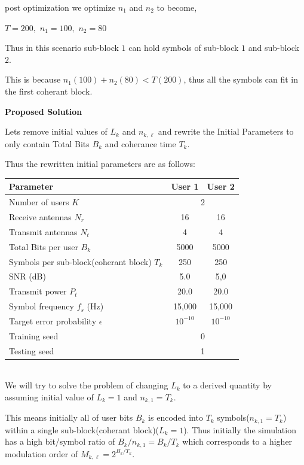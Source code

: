 \documentclass[a4paper, 12pt, onecolumn, journal, twoside, draftclsnofoot]{IEEEtran}
\begin{document}
post optimization we optimize $n_1$ and $n_2$ to become,

$T=200,$
$n_1 = 100,$
$n_2 = 80$

Thus in this scenario sub-block $1$ can hold symbols of sub-block $1$ and sub-block $2$.

This is because $n_1(100) + n_2(80) < T(200)$, thus all the symbols can fit in the first coherant block.

\newpage

\textbf{Proposed Solution}

Lets remove initial values of $L_k$ and $n_{k,\ell}$ and rewrite the Initial Parameters to only contain Total Bits $B_k$ and coherance time $T_k$.

Thus the rewritten initial parameters are as follows:

\begin{tabular}{|l|c|c|}
\hline
\textbf{Parameter} & \textbf{User 1} & \textbf{User 2} \\
\hline
Number of users $K$ & \multicolumn{2}{c|}{2} \\
\hline
Receive antennas $N_r$ & 16 & 16 \\
Transmit antennas $N_t$ & 4 & 4 \\
\hline
Total Bits per user $B_k$ & 5000 & 5000 \\
\hline
Symbols per sub-block(coherant block) $T_k$ & 250 & 250 \\
\hline
SNR (dB) & 5.0 & 5,0 \\
Transmit power $P_t$ & 20.0 & 20.0 \\
\hline
Symbol frequency $f_s$ (Hz) & 15{,}000 & 15{,}000 \\
Target error probability $\epsilon$ & $10^{-10}$ & $10^{-10}$ \\
\hline
Training seed & \multicolumn{2}{c|}{0} \\
Testing seed & \multicolumn{2}{c|}{1} \\
\hline 
\end{tabular} \\

We will try to solve the problem of changing $L_k$ to a derived quantity by assuming initial value of $L_k = 1$ and $n_{k,1} = T_k$.

This means initially all of user bits $B_k$ is encoded into $T_k$ symbols($n_{k,1} = T_k$) within a single sub-block(coherant block)($L_k = 1$).
Thus initially the simulation has a high bit/symbol ratio of $B_k/n_{k,1} = B_k/T_k$ which corresponds to a higher modulation order of $M_{k, \ell} = 2^{B_k/T_k}$.
\end{document}
